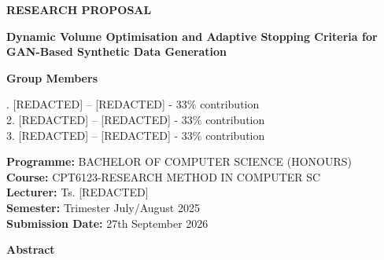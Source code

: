 \documentclass[12pt,a4paper]{report}
\begin{document}
\begin{center}

{\fontsize{18}{22}\selectfont\textbf{RESEARCH PROPOSAL}}

\vspace{0.5cm}

{\fontsize{16}{20}\selectfont\textbf{Dynamic Volume Optimisation and Adaptive Stopping Criteria for GAN-Based Synthetic Data Generation}}

\vspace{1cm}

{\fontsize{12}{14}\selectfont\textbf{Group Members}}

\vspace{0.3cm}

{\fontsize{12}{14}. [REDACTED] -- [REDACTED] - 33\% contribution \\
2. [REDACTED] -- [REDACTED] - 33\% contribution\\
3. [REDACTED] -- [REDACTED] - 33\% contribution\\
}

\vspace{0.8cm}

{\fontsize{12}{14}\selectfont
\textbf{Programme:} BACHELOR OF COMPUTER SCIENCE (HONOURS) \\
\textbf{Course:} CPT6123-RESEARCH METHOD IN COMPUTER SC\\
\textbf{Lecturer:} Ts. [REDACTED]\\
\textbf{Semester:} Trimester July/August 2025\\
\textbf{Submission Date:} 27th September 2026
}

\end{center}


\vspace{0.5cm}

\noindent
\textbf{Abstract}

\vspace{0.2cm}
\end{document}
